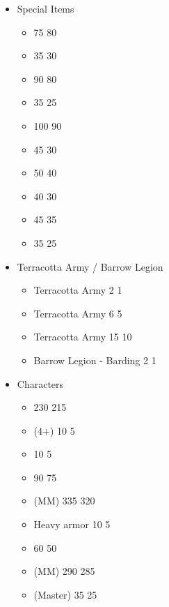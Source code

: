 \begin{itemize}
	\item Special Items
	\begin{itemize}
		\item \godslayer{} 75 \costup{} 80
		\item \scourgeofkings{} 35 \costdown{} 30
		\item \jackalsblessing{} 90 \costdown{} 80
		\item \sunsembrace{} 35 \costdown{} 25
		\item \sacredhourglass{} 100 \costdown{} 90
		\item \bookofthedead{} 45 \costdown{} 30
		\item \steedsofnephetra{} 50 \costdown{} 40
		\item \blessedwrappings{} 40 \costdown{} 30
		\item \ankhofnaptesh{} 45 \costdown{} 35
		\item \sandstormcloak{} 35 \costdown{} 25
	\end{itemize}
	\item Terracotta Army / Barrow Legion
	\begin{itemize}
		\item Terracotta Army \skeletons{} 2 \costdown{} 1
		\item Terracotta Army \necropolisguardSINGULAR{} 6 \costdown{} 5
		\item Terracotta Army \casketsofphatep{} 15 \costdown{} 10
		\item Barrow Legion \skeletoncavalrySINGULAR{} - Barding 2 \costdown{} 1
	\end{itemize}
	\item Characters
	\begin{itemize}
		\item \pharaoh{} \basecost{} 230 \costdown{} 215
		\item \pharaoh{} \greataspenbow{} (4+) 10 \costdown{} 5
		\item \pharaoh{} \lance{} 10 \costdown{} 5
		\item \pharaoh{} \skeletonchariot{} 90 \costdown{} 75
		\item \pharaoh{} \shaguardian{} (MM) 335 \costdown{} 320
		\item \nomarch{} Heavy armor 10 \costdown{} 5
		\item \nomarch{} \skeletonchariot{} 60 \costdown{} 50
		\item \nomarch{} \shaguardian{} (MM) 290 \costdown{} 285
		\item \deathculthierarch{} \hierophant{} (Master) 35 \costdown{} 25

\end{itemize}
\end{itemize}
